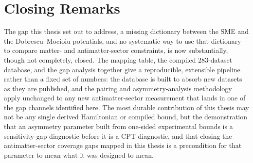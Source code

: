 \section{Closing Remarks}

The gap this thesis set out to address, a missing dictionary between the
SME and the Dobrescu--Mocioiu potentials, and no systematic way to use that
dictionary to compare matter- and antimatter-sector constraints, is now
substantially, though not completely, closed. The mapping table, the
compiled 283-dataset database, and the gap analysis together give a
reproducible, extensible pipeline rather than a fixed set of numbers: the
database is built to absorb new datasets as they are published, and the
pairing and asymmetry-analysis methodology apply unchanged to any new
antimatter-sector measurement that lands in one of the gap channels
identified here. The most durable contribution of this thesis may not be
any single derived Hamiltonian or compiled bound, but the demonstration
that an asymmetry parameter built from one-sided experimental bounds is a
sensitivity-gap diagnostic before it is a CPT diagnostic, and that closing
the antimatter-sector coverage gaps mapped in this thesis is a
precondition for that parameter to mean what it was designed to mean.
